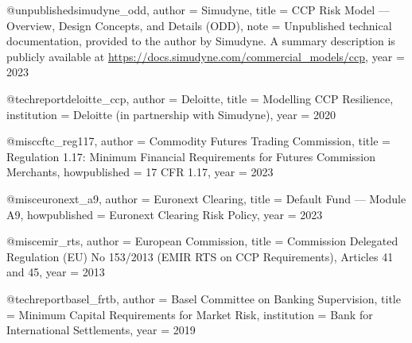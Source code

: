 

@unpublished{simudyne_odd,
  author = {{Simudyne}},
  title  = {{CCP} Risk Model --- Overview, Design Concepts, and Details ({ODD})},
  note   = {Unpublished technical documentation, provided to the author by
            Simudyne. A summary description is publicly available at
            \url{https://docs.simudyne.com/commercial_models/ccp}},
  year   = {2023}
}

@techreport{deloitte_ccp,
  author      = {{Deloitte}},
  title       = {Modelling {CCP} Resilience},
  institution = {Deloitte (in partnership with Simudyne)}, year = {2020}
}


@misc{cftc_reg117,
  author       = {{Commodity Futures Trading Commission}},
  title        = {Regulation 1.17: Minimum Financial Requirements for Futures Commission Merchants},
  howpublished = {17 CFR 1.17}, year = {2023}
}


@misc{euronext_a9,
  author       = {{Euronext Clearing}},
  title        = {Default Fund --- Module A9},
  howpublished = {Euronext Clearing Risk Policy}, year = {2023}
}


@misc{emir_rts,
  author = {{European Commission}},
  title  = {Commission Delegated Regulation (EU) No 153/2013 (EMIR RTS on CCP Requirements), Articles 41 and 45},
  year   = {2013}
}


@techreport{basel_frtb,
  author      = {{Basel Committee on Banking Supervision}},
  title       = {Minimum Capital Requirements for Market Risk},
  institution = {Bank for International Settlements}, year = {2019}
}


